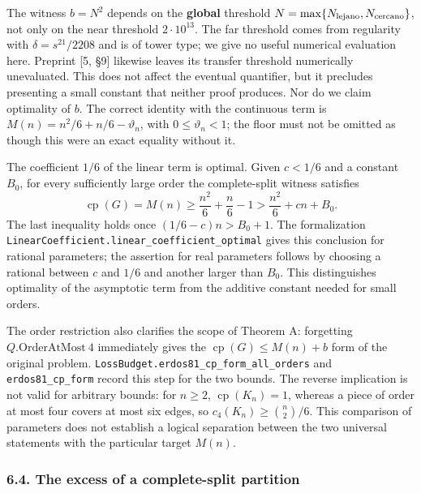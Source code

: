 \documentclass[english,11pt,a4paper]{article}
\begin{document}
The witness \(b=N^2\) depends on the \textbf{global} threshold \(N=\max\{N_{\rm lejano},N_{\rm cercano}\}\), not only on the near threshold \(2\cdot10^{13}\). The far threshold comes from regularity with \(\delta=s^{21}/2208\) and is of tower type; we give no useful numerical evaluation here. Preprint {[}5, §9{]} likewise leaves its transfer threshold numerically unevaluated. This does not affect the eventual quantifier, but it precludes presenting a small constant that neither proof produces. Nor do we claim optimality of \(b\). The correct identity with the continuous term is \(M(n)=n^2/6+n/6-\vartheta_n\), with \(0\le\vartheta_n<1\); the floor must not be omitted as though this were an exact equality without it.

The coefficient \(1/6\) of the linear term is optimal. Given \(c<1/6\) and a constant \(B_0\), for every sufficiently large order the complete-split witness satisfies \[
\operatorname{cp}(G)=M(n)
\ge\frac{n^2}{6}+\frac n6-1
>\frac{n^2}{6}+cn+B_0.
\tag{6.5}
\] The last inequality holds once \((1/6-c)n>B_0+1\). The formalization \nolinkurl{LinearCoefficient.linear_coefficient_optimal} gives this conclusion for rational parameters; the assertion for real parameters follows by choosing a rational between \(c\) and \(1/6\) and another larger than \(B_0\). This distinguishes optimality of the asymptotic term from the additive constant needed for small orders.

The order restriction also clarifies the scope of Theorem A: forgetting \(Q.\mathrm{OrderAtMost}\ 4\) immediately gives the \(\operatorname{cp}(G)\le M(n)+b\) form of the original problem. \nolinkurl{LossBudget.erdos81_cp_form_all_orders} and \nolinkurl{erdos81_cp_form} record this step for the two bounds. The reverse implication is not valid for arbitrary bounds: for \(n\ge2\), \(\operatorname{cp}(K_n)=1\), whereas a piece of order at most four covers at most six edges, so \(c_4(K_n)\ge\binom n2/6\). This comparison of parameters does not establish a logical separation between the two universal statements with the particular target \(M(n)\).

\subsubsection{6.4. The excess of a complete-split partition}\label{the-excess-of-a-complete-split-partition}
\end{document}

